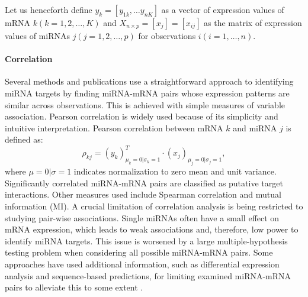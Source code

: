 

Let us henceforth define $y_k = [y_{1k}, \dotsc y_{nK}]$ as a vector of expression
values of mRNA $k (k = 1, 2, \dotsc, K)$ and $X_{n \times p} = [x_j] =
[x_{ij}]$ as the matrix of expression values of miRNAs $j (j = 1, 2, \ldots,
p)$ for observations $i (i = 1, \ldots, n)$.

\paragraph{Correlation}
Several methods and publications use a straightforward approach to identifying
miRNA targets by finding miRNA-mRNA pairs whose expression patterns are
similar across observations. This is achieved with simple measures of variable
association. Pearson correlation is widely used because of its simplicity
and intuitive interpretation. Pearson correlation between mRNA $k$ and miRNA
$j$ is defined as:
\begin{equation}
	\rho_{kj} = (y_k)_{\mu_k=0|\sigma_k=1}^T \cdot (x_j)_{\mu_j=0|\sigma_j=1},
	\label{eq:pearson}
\end{equation}
where $\mu=0|\sigma=1$ indicates normalization to zero mean and unit
variance. Significantly correlated miRNA-mRNA pairs are classified as putative
target interactions. Other measures used include Spearman correlation and
mutual information (MI). A crucial limitation of correlation analysis is being
restricted to studying pair-wise associations. Single miRNAs often have a
small effect on mRNA expression, which leads to weak associations and,
therefore, low power to identify miRNA targets. This issue is worsened by a
large multiple-hypothesis testing problem when considering all possible miRNA-mRNA
pairs. Some approaches have used additional information, such as
differential expression analysis and sequence-based predictions, for limiting
examined miRNA-mRNA pairs to alleviate this to some extent
\citep{Muniategui2013}.

